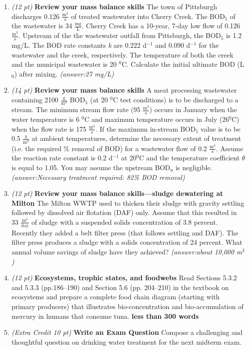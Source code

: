 \documentclass[12pt,letterpaper]{article}
\begin{document}
\begin{enumerate}
\item \emph{(12 pt)} \textbf{Review your mass balance skills} The town of Pittsburgh discharges 0.126 $\mathrm{\frac{m^3}{s}}$ of treated wastewater into Cherry Creek.  The BOD$_5$ of the wastewater is 34 $\mathrm{\frac{mg}{L}}$.  Cherry Creek has a 10-year, 7-day low flow of 0.126 $\mathrm{\frac{m^3}{s}}$.  Upstream of the the wastewater outfall from Pittsburgh, the BOD$_5$ is 1.2 mg/L.  The BOD rate constants \emph{k} are 0.222 d$^{-1}$ and 0.090 d$^{-1}$ for the wastewater and the creek, respectively.  The temperature of both the creek and the municipal wastewater is 20 $^0$C. Calculate the initial ultimate BOD (L$_0$) after mixing. \emph{(answer:27 mg/L)}

\item \emph{(14 pt)} \textbf{Review your mass balance skills} A meat processing wastewater containing 2100 $\mathrm{\frac{g}{m^3}}$ BOD$_5$ (at 20 $^0$C test conditions) is to be discharged to a stream.  The minimum stream flow rate (95 $\mathrm{\frac{m^3}{s}}$) occurs in January when the water temperature is 6 $^0$C and maximum temperature occurs in July (26$^0$C) when the flow rate is 175 $\mathrm{\frac{m^3}{s}}$.  If the maximum in-stream BOD$_5$  value is to be 0.5 $\mathrm{\frac{g}{m^3}}$ at ambient temperatures, determine the necessary extent of treatment (i.e. the required \% removal of BOD) for a wastewater flow of 0.2 $\mathrm{\frac{m^3}{s}}$.  Assume the reaction rate constant is 0.2 d$^{-1}$ at 20$^0$C and the temperature coefficient $\theta$ is equal to 1.05.  You may assume the upstream BOD$\mathrm{_u}$ is negligible. \emph{(answer:Necessary treatment required: 82\% BOD removal)}

\item \emph{(12 pt)} \textbf{Review your mass balance skills---sludge dewatering at Milton} The Milton WWTP used to thicken their sludge with gravity settling followed by dissolved air flotation (DAF) only.  Assume that this resulted in 33 $\mathrm{\frac{m^3}{day}}$ of sludge with a suspended solids concentration of 3.8 percent.  Recently they added a belt filter press (that follows settling and DAF).  The filter press produces a sludge with a solids concentration of 24 percent.  What annual volume savings of sludge have they achieved? \emph{(answer:about 10,000 m$^3$)}

\item \emph{(12 pt)} \textbf{Ecosystems, trophic states, and foodwebs}
Read Sections 5.3.2 and 5.3.3 (pp.186--190) and Section 5.6 (pp. 204--210) in the textbook on ecosystems and prepare a complete food chain diagram (starting with primary producers) that illustrates bio-concentration and bio-accumulation of mercury in humans that consume tuna. \textbf{less than 300 words}

\item \emph{(Extra Credit 10 pt)} \textbf{Write an Exam Question} Compose a challenging and thoughtful question on drinking water treatment for the next midterm exam.

\end{enumerate}
\end{document}
